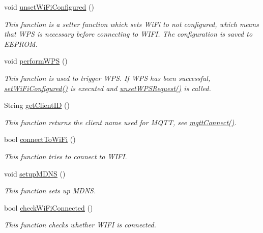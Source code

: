 \begin{DoxyCompactItemize}
void \hyperlink{WIFIOnOff_8ino_ac782bcb28cf6c4cf77d8a408fe02c2f9}{unset\-Wi\-Fi\-Configured} ()
\begin{DoxyCompactList}\small\item\em This function is a setter function which sets Wi\-Fi to not configured, which means that W\-P\-S is necessary before connecting to W\-I\-F\-I. The configuration is saved to E\-E\-P\-R\-O\-M. \end{DoxyCompactList}\item 
void \hyperlink{WIFIOnOff_8ino_aa51eb2a71952e54dba6130be21b3a1d7}{perform\-W\-P\-S} ()
\begin{DoxyCompactList}\small\item\em This function is used to trigger W\-P\-S. If W\-P\-S has been successful, \hyperlink{WIFIOnOff_8ino_a3ebcee2a9d20137810223c6813e54787}{set\-Wi\-Fi\-Configured()} is executed and \hyperlink{WIFIOnOff_8ino_a86eebd69aeee5bbb5e648fc099b4b360}{unset\-W\-P\-S\-Request()} is called. \end{DoxyCompactList}\item 
String \hyperlink{WIFIOnOff_8ino_a688bc5c57984763646a5dd2f72943255}{get\-Client\-I\-D} ()
\begin{DoxyCompactList}\small\item\em This function returns the client name used for M\-Q\-T\-T, see \hyperlink{WIFIOnOff_8ino_a9ad5cb858c24c53a6eaa846b713bd120}{mqtt\-Connect()}. \end{DoxyCompactList}\item 
bool \hyperlink{WIFIOnOff_8ino_a31eed9b3718a60b96c1fea76590a3fc5}{connect\-To\-Wi\-Fi} ()
\begin{DoxyCompactList}\small\item\em This function tries to connect to W\-I\-F\-I. \end{DoxyCompactList}\item 
void \hyperlink{WIFIOnOff_8ino_aa61ca7b9fb98de7d85d230a82ea7de28}{setup\-M\-D\-N\-S} ()
\begin{DoxyCompactList}\small\item\em This function sets up M\-D\-N\-S. \end{DoxyCompactList}\item 
bool \hyperlink{WIFIOnOff_8ino_a7e0fb4debe9d6029fd560490e0d89062}{check\-Wi\-Fi\-Connected} ()
\begin{DoxyCompactList}\small\item\em This function checks whether W\-I\-F\-I is connected. \end{DoxyCompactList}\item 

\end{DoxyCompactItemize}
